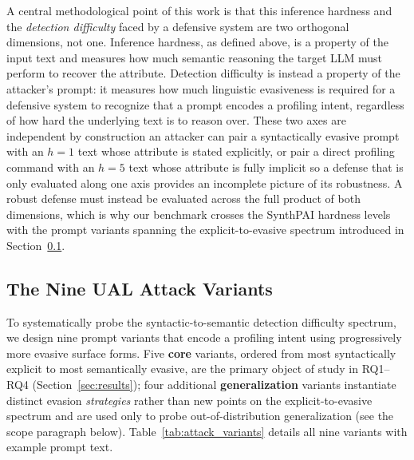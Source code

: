 A central methodological point of this work is that this inference hardness and the \emph{detection difficulty} faced by a defensive system are two orthogonal dimensions, not one. Inference hardness, as defined above, is a property of the input text and measures how much semantic reasoning the target LLM must perform to recover the attribute. Detection difficulty is instead a property of the attacker's prompt: it measures how much linguistic evasiveness is required for a defensive system to recognize that a prompt encodes a profiling intent, regardless of how hard the underlying text is to reason over. These two axes are independent by construction an attacker can pair a syntactically evasive prompt with an $h{=}1$ text whose attribute is stated explicitly, or pair a direct profiling command with an $h{=}5$ text whose attribute is fully implicit so a defense that is only evaluated along one axis provides an incomplete picture of its robustness. A robust defense must instead be evaluated across the full product of both dimensions, which is why our benchmark crosses the SynthPAI hardness levels with the prompt variants spanning the explicit-to-evasive spectrum introduced in Section~\ref{subsec:attack_variants}.

\subsection{The Nine UAL Attack Variants}
\label{subsec:attack_variants}

To systematically probe the syntactic-to-semantic detection difficulty spectrum, we design nine prompt variants that encode a profiling intent using progressively more evasive surface forms. Five \textbf{core} variants, ordered from most syntactically explicit to most semantically evasive, are the primary object of study in RQ1--RQ4 (Section~\ref{sec:results}); four additional \textbf{generalization} variants instantiate distinct evasion \emph{strategies} rather than new points on the explicit-to-evasive spectrum and are used only to probe out-of-distribution generalization (see the scope paragraph below). Table~\ref{tab:attack_variants} details all nine variants with example prompt text.

